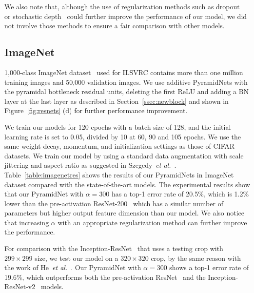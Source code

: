 \documentclass[10pt,twocolumn,letterpaper]{article}
\begin{document}
We also note that, although the use of regularization methods such as dropout~\cite{dropout} or stochastic depth~\cite{stochasticdepth} could further improve the performance of our model, we did not involve those methods to ensure a fair comparison with other models.

\subsection{ImageNet}
1,000-class ImageNet dataset~\cite{ImageNet} used for ILSVRC contains more than one million training images and 50,000 validation images. We use additive PyramidNets with the pyramidal bottleneck residual units, deleting the first ReLU and adding a BN layer at the last layer as described in Section~\ref{ssec:newblock} and shown in Figure~\ref{fig:resnets} (d) for further performance improvement.

We train our models for 120 epochs with a batch size of 128, and the initial learning rate is set to 0.05, divided by 10 at 60, 90 and 105 epochs. We use the same weight decay, momentum, and initialization settings as those of CIFAR datasets. We train our model by using a standard data augmentation with scale jittering and aspect ratio as suggested in Szegedy~{\it et al.}~\cite{GoogleNet}. Table~\ref{table:imagenetres} shows the results of our PyramidNets in ImageNet dataset compared with the state-of-the-art models. The experimental results show that our PyramidNet with $\alpha=300$ has a top-1 error rate of 20.5$\%$, which is 1.2$\%$ lower than the pre-activation ResNet-200~\cite{preresnet} which has a similar number of parameters but higher output feature dimension than our model. We also notice that increasing $\alpha$ with an appropriate regularization method can further improve the performance.

For comparison with the Inception-ResNet~\cite{InceptionResnet} that uses a testing crop with $299\times 299$ size, we test our model on a $320\times 320$ crop, by the same reason with the work of He~{\it et al.}~\cite{preresnet}. Our PyramidNet with $\alpha=300$ shows a top-1 error rate of 19.6$\%$, which outperforms both the pre-activation ResNet~\cite{preresnet} and the Inception-ResNet-v2~\cite{InceptionResnet} models.
\end{document}
